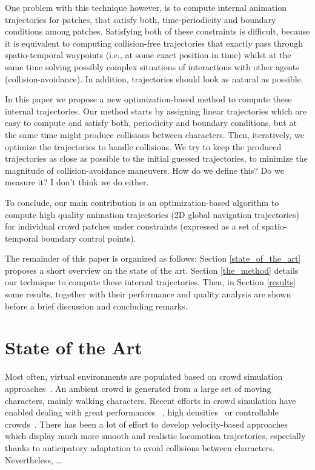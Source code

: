 \documentclass[conference]{acmsiggraph}
\newcommand\devin[1]{{\color{BurntOrange}#1}}
\newcommand\panayiotis[1]{{\color{Green}#1}}
\newcommand\note[1]{{\color{Red}#1}}
\begin{document}
One problem with this technique however, is to compute internal animation trajectories for patches, that satisfy both, time-periodicity and boundary conditions among patches. Satisfying both of these constraints is difficult, because it is equivalent to computing collision-free trajectories that exactly pass through spatio-temporal waypoints (i.e., at some exact position in time) whilst at the same time solving possibly complex situations of interactions with other agents (collision-avoidance). In addition, trajectories should look as natural as possible.

In this paper we propose a new optimization-based method to compute these internal trajectories. Our method starts by assigning linear trajectories which are easy to compute and satisfy both, periodicity and boundary conditions, but at the same time might produce collisions between characters. Then, iteratively, we optimize the trajectories to handle collisions. We try to keep the produced trajectories as close as possible to the initial guessed trajectories, to \note{minimize the magnitude of collision-avoidance maneuvers.} \panayiotis{How do we define this? Do we measure it?} \devin{I don't think we do either.}

To conclude, our main contribution is an optimization-based algorithm to compute high quality animation trajectories (2D global navigation trajectories) for individual crowd patches under constraints (expressed as a set of spatio-temporal boundary control points).

The remainder of this paper is organized as follows: Section \ref{state_of_the_art} proposes a short overview on the state of the art. Section \ref{the_method} details our technique to compute these internal trajectories. Then, in Section \ref{results} some results, together with their performance and quality analysis are shown before a brief discussion and concluding remarks. 

\section{State of the Art \label{state_of_the_art}}

Most often, virtual environments are populated based on crowd simulation approaches~\cite{ThalmannBook:2013}. An ambient crowd is generated from a large set of moving characters, mainly walking characters. Recent efforts in crowd simulation have enabled dealing with great performances ~\cite{PettreCAVW:2006,Treuille:2006}, high densities~\cite{Narain:2009} or controllable crowds~\cite{Guy:2009}. There has been a lot of effort to develop velocity-based approaches~\cite{Paris:2007,VanDenBerg:2008} which display much more smooth and realistic locomotion trajectories, especially thanks to anticipatory adaptation to avoid collisions between characters. \note{Nevertheless, \dots}
\end{document}
